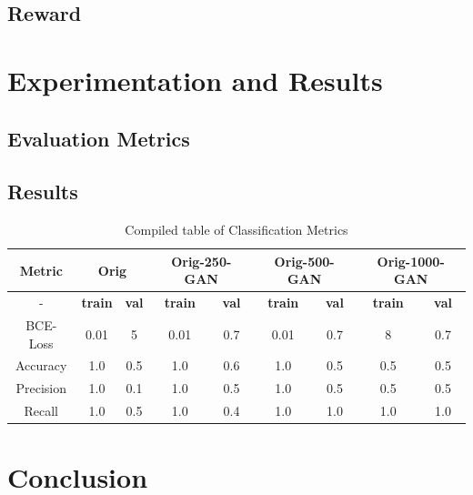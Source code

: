 \documentclass[conference]{IEEEtran}
\begin{document}
\subsection{Reward}


\section{Experimentation and Results}

\subsection{Evaluation Metrics}


\subsection{Results}


\begin{table}[h!]
\centering
\begin{tabular}{| *{9}{c|} }
    \hline
\textbf{Metric}    & \multicolumn{2}{c|}{Orig}
            & \multicolumn{2}{c|}{Orig-250-GAN}
                    & \multicolumn{2}{c|}{Orig-500-GAN}
                            & \multicolumn{2}{c|}{Orig-1000-GAN}                \\
    \hline
-   &   \textbf{train}  &   \textbf{val}  &   \textbf{train}  &   \textbf{val}  &   \textbf{train}  &   \textbf{val}  &   \textbf{train}  &   \textbf{val}  \\
    \hline
BCE-Loss   &   0.01  &   5  &   0.01  &   0.7  &  0.01   &  0.7   &   8  &  0.7   \\
    \hline
Accuracy   &    1.0   &     0.5  &   1.0    &     0.6  &   1.0    &    0.5   &   0.5    &   0.5    \\
    \hline
Precision   &   1.0    &   0.1    &   1.0    &    0.5   &   1.0    &    0.5   &   0.5    &    0.5   \\
    \hline
Recall   &    1.0   &    0.5   &    1.0   &   0.4   &    1.0   &    1.0   &    1.0   &  1.0     \\
    \hline

\end{tabular}
\caption{Compiled table of Classification Metrics}
\end{table}

\section{Conclusion}


\end{document}
